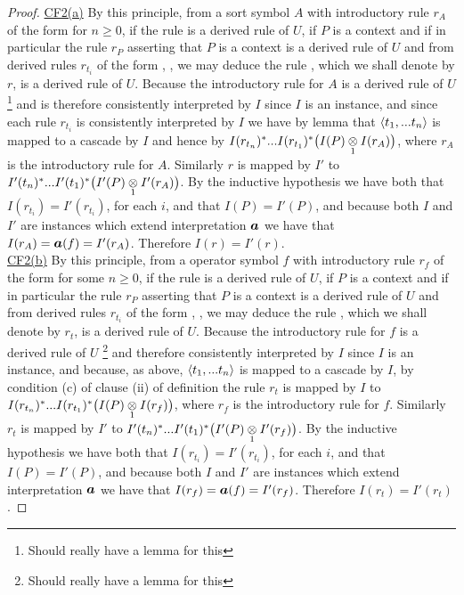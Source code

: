 \begin{proof}
\underline{CF2(a)} 
By this principle, from a sort symbol $A$ with introductory rule $r_A$ of the form  for  $n \geq 0$, 
if the rule  is a derived rule of $U$,
if $P$ is a context and if in particular the rule $r_P$ asserting that $P$ is a context is a derived rule of $U$
and from derived rules $r_{t_i}$ of the form , \foreachi, we may deduce
the rule , which we shall denote by $r$, is a derived rule of $U$. 
Because the introductory rule for $A$ is a derived rule of $U$ \footnote{Should really have a lemma for this} and is therefore consistently interpreted by $I$
since $I$ is an instance, and since  each rule $r_{t_i}$ is consistently interpreted by $I$ we have by lemma 
that $\tuple{\tn}$ is mapped to a cascade by $I$ and hence by 
$I(r_{t_n})^* ... I(r_{t_1})^*\big(\crossx{I(P)}{I(r_A)}{1}\big)$, where $r_A$ is the introductory rule for $A$.
Similarly $r$ is mapped by $I'$ to
$I'(t_n)^* ... I'(t_1)^*\big(\crossx{I'(P)}{I'(r_A)}{1}\big)$.
By the inductive hypothesis we have both that $I(r_{t_i})=I'(r_{t_i})$, for each $i$, and that $I(P)=I'(P)$,  and 
because both $I$ and $I'$ are instances which extend interpretation $\iI$
we have that $I(r_A)=\iI(f)=I'(r_A)$. Therefore $I(r)=I'(r)$.
\\

\underline{CF2(b)} By this principle, from a operator symbol $f$ with introductory rule $r_f$ of the form  for some $n \geq 0$, if the rule  is a derived rule of $U$,
if $P$ is a context and if in particular the rule $r_P$ asserting that $P$ is a context is a derived rule of $U$
and from derived rules $r_{t_i}$ of the form , \foreachi, we may deduce
the rule , which we shall denote by $r_t$, is a derived rule of $U$. 
Because the introductory rule for $f$ is a derived rule of $U$ \footnote{Should really have a lemma for this} and therefore consistently interpreted by $I$
since $I$ is an instance, and because, as above,  $\tuple{\tn}$ is mapped to a cascade by $I$,
by condition (c) of clause (ii) of definition  the rule $r_t$ is mapped  by $I$ to
$I(r_{t_n})^* ... I(r_{t_1})^*\big(\crossx{I(P)}{I(r_f)}{1}\big)$, where $r_f$ is the introductory rule for $f$.
Similarly $r_t$ is mapped by $I'$ to
$I'(t_n)^* ... I'(t_1)^*\big(\crossx{I'(P)}{I'(r_f)}{1}\big)$.
By the inductive hypothesis we have both that $I(r_{t_i})=I'(r_{t_i})$, for each $i$, and that $I(P)=I'(P)$,  and 
because both $I$ and $I'$ are instances which extend interpretation $\iI$
we have that $I(r_f)=\iI(f)=I'(r_f)$. Therefore $I(r_t)=I'(r_t)$.
\end{proof}

